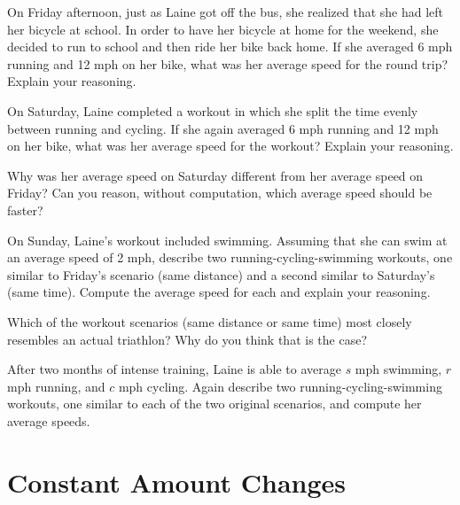 \documentclass[justified,openany,nofonts]{tufte-book}
\begin{document}
\begin{prob} 
On Friday afternoon, just as Laine got off the bus, she realized that she had left her bicycle at school.  In order to have her bicycle at home for the weekend, she decided to run to school and then ride her bike back home.  If she averaged 6 mph running and 12 mph on her bike, what was her average speed for the round trip?  Explain your reasoning. 
\end{prob}
\begin{prob}
On Saturday, Laine completed a workout in which she split the time evenly between running and cycling.  If she again averaged 6 mph running and 12 mph on her bike, what was her average speed for the workout?  Explain your reasoning. 
\end{prob}
\begin{prob}
Why was her average speed on Saturday different from her average speed on Friday?  Can you reason, without computation, which average speed should be faster?  
\end{prob}
\begin{prob} On Sunday, Laine's workout included swimming.  Assuming that she can swim at an average speed of 2 mph, describe two running-cycling-swimming workouts, one similar to Friday's scenario (same distance) and a second similar to Saturday's (same time).  Compute the average speed for each and explain your reasoning.  
\end{prob}
\begin{prob}
Which of the workout scenarios (same distance or same time) most closely resembles an actual triathlon?  Why do you think that is the case?
\end{prob}
\begin{prob}
After two months of intense training, Laine is able to average $s$ mph swimming, $r$ mph running, and $c$ mph cycling.  Again describe two running-cycling-swimming workouts, one similar to each of the two original scenarios, and compute her average speeds.     
\end{prob}

\newpage
\section{Constant Amount Changes}\label{A:ConstantAmount}
\end{document}
